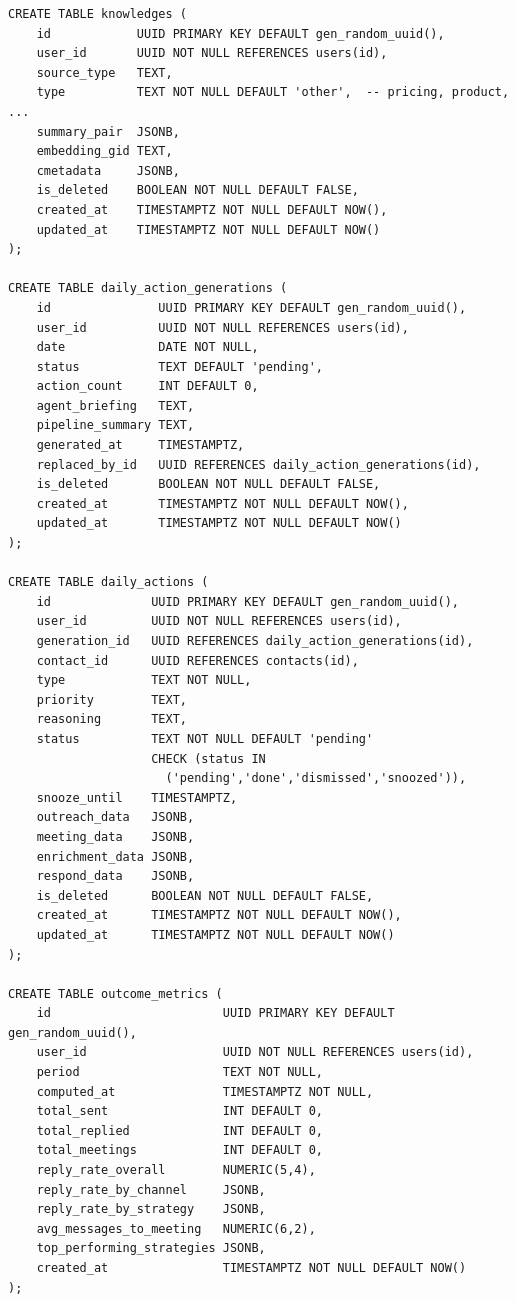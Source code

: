 \documentclass[a4paper]{article}
\begin{document}
\begin{tcolorbox}[sqlstyle, title=AI and Daily Actions]
\begin{Verbatim}[fontsize=\small]
CREATE TABLE knowledges (
    id            UUID PRIMARY KEY DEFAULT gen_random_uuid(),
    user_id       UUID NOT NULL REFERENCES users(id),
    source_type   TEXT,
    type          TEXT NOT NULL DEFAULT 'other',  -- pricing, product, ...
    summary_pair  JSONB,
    embedding_gid TEXT,
    cmetadata     JSONB,
    is_deleted    BOOLEAN NOT NULL DEFAULT FALSE,
    created_at    TIMESTAMPTZ NOT NULL DEFAULT NOW(),
    updated_at    TIMESTAMPTZ NOT NULL DEFAULT NOW()
);

CREATE TABLE daily_action_generations (
    id               UUID PRIMARY KEY DEFAULT gen_random_uuid(),
    user_id          UUID NOT NULL REFERENCES users(id),
    date             DATE NOT NULL,
    status           TEXT DEFAULT 'pending',
    action_count     INT DEFAULT 0,
    agent_briefing   TEXT,
    pipeline_summary TEXT,
    generated_at     TIMESTAMPTZ,
    replaced_by_id   UUID REFERENCES daily_action_generations(id),
    is_deleted       BOOLEAN NOT NULL DEFAULT FALSE,
    created_at       TIMESTAMPTZ NOT NULL DEFAULT NOW(),
    updated_at       TIMESTAMPTZ NOT NULL DEFAULT NOW()
);

CREATE TABLE daily_actions (
    id              UUID PRIMARY KEY DEFAULT gen_random_uuid(),
    user_id         UUID NOT NULL REFERENCES users(id),
    generation_id   UUID REFERENCES daily_action_generations(id),
    contact_id      UUID REFERENCES contacts(id),
    type            TEXT NOT NULL,
    priority        TEXT,
    reasoning       TEXT,
    status          TEXT NOT NULL DEFAULT 'pending'
                    CHECK (status IN
                      ('pending','done','dismissed','snoozed')),
    snooze_until    TIMESTAMPTZ,
    outreach_data   JSONB,
    meeting_data    JSONB,
    enrichment_data JSONB,
    respond_data    JSONB,
    is_deleted      BOOLEAN NOT NULL DEFAULT FALSE,
    created_at      TIMESTAMPTZ NOT NULL DEFAULT NOW(),
    updated_at      TIMESTAMPTZ NOT NULL DEFAULT NOW()
);

CREATE TABLE outcome_metrics (
    id                        UUID PRIMARY KEY DEFAULT gen_random_uuid(),
    user_id                   UUID NOT NULL REFERENCES users(id),
    period                    TEXT NOT NULL,
    computed_at               TIMESTAMPTZ NOT NULL,
    total_sent                INT DEFAULT 0,
    total_replied             INT DEFAULT 0,
    total_meetings            INT DEFAULT 0,
    reply_rate_overall        NUMERIC(5,4),
    reply_rate_by_channel     JSONB,
    reply_rate_by_strategy    JSONB,
    avg_messages_to_meeting   NUMERIC(6,2),
    top_performing_strategies JSONB,
    created_at                TIMESTAMPTZ NOT NULL DEFAULT NOW()
);
\end{Verbatim}
\end{tcolorbox}
\end{document}
